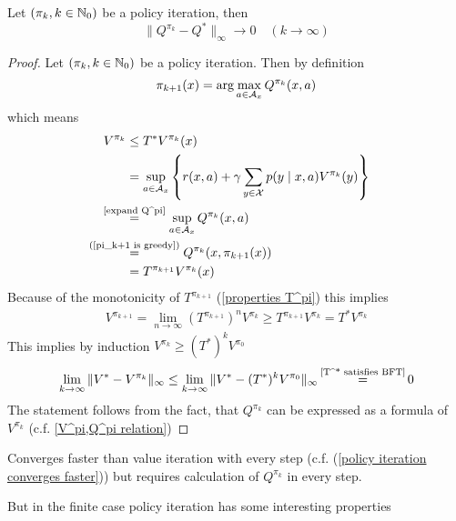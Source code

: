 \begin{prop}
	Let \((\pi_k,k\in\mathbb{N}_0)\) be a policy iteration, then
	\[\|Q^{\pi_k}-Q^*\|_\infty \to 0 \quad (k\to\infty) \] 
\end{prop}
\begin{proof}
	Let \((\pi_k,k\in\mathbb{N}_0)\) be a policy iteration. Then by definition
	\begin{align}\label{pi_k+1 is greedy}
		\pi_{k+1}(x)=\arg\max_{a\in\mathcal{A}_x} Q^{\pi_k}(x,a) 
	\end{align}
	which means
	\begin{align}
		V^{\pi_k} &\le T^* V^{\pi_k}(x)
		\label{real improvement or optimal}\\
		&=\sup_{a\in\cA_x}\left\{r(x,a)+\gamma \sum_{y\in\cX}p(y\mid x,a)V^{\pi_k}(y) \right\}
		\nonumber\\
		&\lxeq{\text{\ref{expand Q^pi}}}\sup_{a\in\cA_x}Q^{\pi_k}(x,a)
		\nonumber\\
		&\lxeq{\text{(\ref{pi_k+1 is greedy})} }Q^{\pi_k}(x,\pi_{k+1}(x))
		\nonumber\\
		&=T^{\pi_{k+1}}V^{\pi_k}(x)
		\nonumber
	\end{align}
	Because of the monotonicity of \(T^{\pi_{k+1}}\) (\ref{properties T^pi}) this implies
	\begin{align}\label{policy iteration converges faster}
		V^{\pi_{k+1}}=\lim_{n\to\infty}(T^{\pi_{k+1}})^n V^{\pi_k}
		\ge T^{\pi_{k+1}} V^{\pi_k} 
		= T^* V^{\pi_k}
	\end{align}
	This implies by induction \(V^{\pi_{k}} \ge (T^*)^k V^{\pi_0}\)
	\begin{align*}
		\lim_{k\to\infty} \|V^* - V^{\pi_k}\|_\infty 
		\le \lim_{k\to\infty} \|V^* - (T^*)^k V^{\pi_0}\|_\infty 
		\xeq{\text{\ref{T^* satisfies BFT}}} 0
	\end{align*}
	The statement follows from the fact, that \(Q^{\pi_k}\) can be expressed as a formula of \(V^{\pi_k}\) (c.f. \ref{V^pi,Q^pi relation}) 
\end{proof}  

Converges faster than value iteration with every step 
(c.f. (\ref{policy iteration converges faster})) but requires calculation of \(Q^{\pi_k}\) in every step.

But in the finite case policy iteration has some interesting properties


